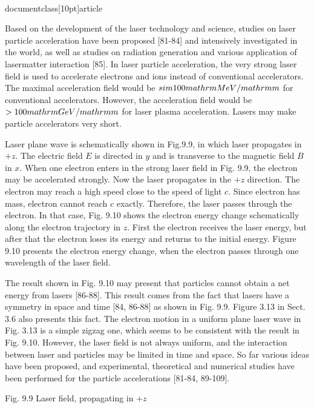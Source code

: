 \\documentclass[10pt]{article}
\begin{document}
{{{{{{Based on the development of the laser technology and science, studies on laser particle acceleration have been proposed [81-84] and intensively investigated in the world, as well as studies on radiation generation and various application of lasermatter interaction [85]. In laser particle acceleration, the very strong laser field is used to accelerate electrons and ions instead of conventional accelerators. The maximal acceleration field would be $\\sim 100 \\mathrm{MeV} / \\mathrm{m}$ for conventional accelerators. However, the acceleration field would be $>100 \\mathrm{GeV} / \\mathrm{m}$ for laser plasma acceleration. Lasers may make particle accelerators very short.

Laser plane wave is schematically shown in Fig.9.9, in which laser propagates in $+z$. The electric field $E$ is directed in $y$ and is transverse to the magnetic field $B$ in $x$. When one electron enters in the strong laser field in Fig. 9.9, the electron may be accelerated strongly. Now the laser propagates in the $+z$ direction. The electron may reach a high speed close to the speed of light $c$. Since electron has mass, electron cannot reach $c$ exactly. Therefore, the laser passes through the electron. In that case, Fig. 9.10 shows the electron energy change schematically along the electron trajectory in $z$. First the electron receives the laser energy, but after that the electron loses its energy and returns to the initial energy. Figure 9.10 presents the electron energy change, when the electron passes through one wavelength of the laser field.

The result shown in Fig. 9.10 may present that particles cannot obtain a net energy from lasers [86-88]. This result comes from the fact that lasers have a symmetry in space and time [84, 86-88] as shown in Fig. 9.9. Figure 3.13 in Sect. 3.6 also presents this fact. The electron motion in a uniform plane laser wave in Fig. 3.13 is a simple zigzag one, which seems to be consistent with the result in Fig. 9.10. However, the laser field is not always uniform, and the interaction between laser and particles may be limited in time and space. So far various ideas have been proposed, and experimental, theoretical and numerical studies have been performed for the particle accelerations [81-84, 89-109].

Fig. 9.9 Laser field, propagating in $+z$

}}}}}}
\end{document}

